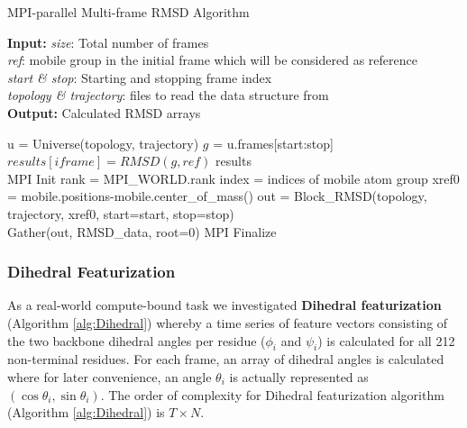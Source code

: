\begin{algorithm}[ht]
	\scriptsize
	\caption{MPI-parallel Multi-frame RMSD Algorithm}
	\label{alg:RMSD_sug}
	\hspace*{\algorithmicindent} \textbf{Input:} \emph{size}: Total number of frames \\
	\hspace*{\algorithmicindent} \emph{ref}: mobile group in the initial frame which will be considered as reference \\
	\hspace*{\algorithmicindent} \emph{start \& stop}: Starting and stopping frame index\\
	\hspace*{\algorithmicindent} \emph{topology \& trajectory}: files to read the data structure from \\
	\hspace*{\algorithmicindent} \textbf{Output:} Calculated RMSD arrays
	\begin{algorithmic}[1]
		\State u = Universe(topology, trajectory)
		\State $g$ = u.frames[start:stop]
		\State $results[iframe] = RMSD(g, ref)$
		\EndFor
		\State \Return results
		\EndProcedure
		\\        
		\State MPI Init
		\State rank = MPI\_WORLD.rank
		\State index = indices of mobile atom group
		\State xref0 = mobile.positions-mobile.center\_of\_mass()
		\State out = Block\_RMSD(topology, trajectory, xref0, start=start, stop=stop)
		\\
		\State Gather(out, RMSD\_data, root=0)
		\State MPI Finalize
	\end{algorithmic}
\end{algorithm}

\subsubsection{Dihedral Featurization}
As a real-world compute-bound task we investigated \textbf{Dihedral featurization} \cite{Sittel:2014aa} (Algorithm \ref{alg:Dihedral}) whereby a time series of
feature vectors consisting of the two backbone dihedral angles per residue ($\phi_{i}$ and $\psi_{i}$) is calculated for all 212
non-terminal residues. For each frame, an array of dihedral angles is calculated where for later convenience, an angle $\theta_{i}$ is
actually represented as $(\cos\theta_{i}, \sin\theta_{i})$. 
The order of complexity for Dihedral featurization algorithm (Algorithm \ref{alg:Dihedral}) is $T \times N$. 

